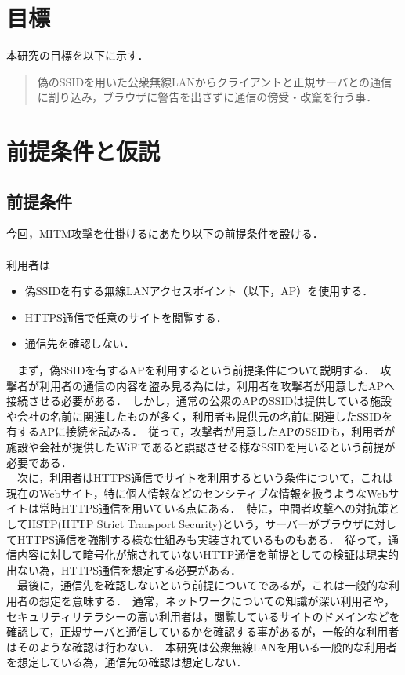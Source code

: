 \documentclass[dvipdfmx]{jsarticle}
\begin{document}
    \section{目標}
        本研究の目標を以下に示す．
        \begin{quote}
            偽のSSIDを用いた公衆無線LANからクライアントと正規サーバとの通信に割り込み，ブラウザに警告を出さずに通信の傍受・改竄を行う事．\
        \end{quote}
    \section{前提条件と仮説}
        \subsection{前提条件}
            今回，MITM攻撃を仕掛けるにあたり以下の前提条件を設ける．\\
            \\
            利用者は
            \begin{itemize}
                \item 偽SSIDを有する無線LANアクセスポイント（以下，AP）を使用する．
                \item HTTPS通信で任意のサイトを閲覧する．
                \item 通信先を確認しない．
            \end{itemize}
            　まず，偽SSIDを有するAPを利用するという前提条件について説明する．\
            攻撃者が利用者の通信の内容を盗み見る為には，利用者を攻撃者が用意したAPへ接続させる必要がある．\
            しかし，通常の公衆のAPのSSIDは提供している施設や会社の名前に関連したものが多く，利用者も提供元の名前に関連したSSIDを有するAPに接続を試みる．\
            従って，攻撃者が用意したAPのSSIDも，利用者が施設や会社が提供したWiFiであると誤認させる様なSSIDを用いるという前提が必要である．\\
            　次に，利用者はHTTPS通信でサイトを利用するという条件について，これは現在のWebサイト，特に個人情報などのセンシティブな情報を扱うようなWebサイトは常時HTTPS通信を用いている点にある．\
            特に，中間者攻撃への対抗策としてHSTP(HTTP Strict Transport Security)という，サーバーがブラウザに対してHTTPS通信を強制する様な仕組みも実装されているものもある．\
            従って，通信内容に対して暗号化が施されていないHTTP通信を前提としての検証は現実的出ない為，HTTPS通信を想定する必要がある．\\
            　最後に，通信先を確認しないという前提についてであるが，これは一般的な利用者の想定を意味する．\
            通常，ネットワークについての知識が深い利用者や，セキュリティリテラシーの高い利用者は，閲覧しているサイトのドメインなどを確認して，正規サーバと通信しているかを確認する事があるが，一般的な利用者はそのような確認は行わない．\
            本研究は公衆無線LANを用いる一般的な利用者を想定している為，通信先の確認は想定しない．\\
\end{document}
